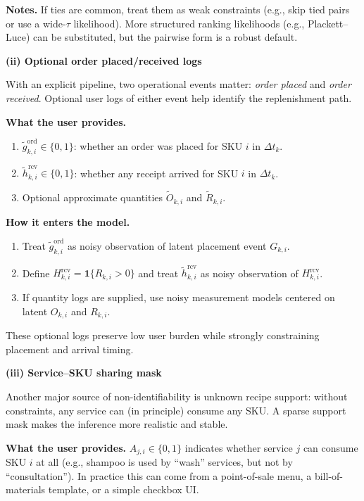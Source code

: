 \documentclass[11pt]{article}
\begin{document}
\textbf{Notes.} If ties are common, treat them as weak constraints (e.g., skip tied pairs or use a wide-$\tau$ likelihood).
More structured ranking likelihoods (e.g., Plackett--Luce) can be substituted, but the pairwise form is a robust default.

\textbf{(ii) Optional order placed/received logs}

With an explicit pipeline, two operational events matter: \emph{order placed} and \emph{order received}.
Optional user logs of either event help identify the replenishment path.

\textbf{What the user provides.}
\begin{enumerate}
  \item $\tilde g^{\mathrm{ord}}_{k,i}\in\{0,1\}$: whether an order was placed for SKU $i$ in $\Delta t_k$.
  \item $\tilde h^{\mathrm{rcv}}_{k,i}\in\{0,1\}$: whether any receipt arrived for SKU $i$ in $\Delta t_k$.
  \item Optional approximate quantities $\tilde O_{k,i}$ and $\tilde R_{k,i}$.
\end{enumerate}

\textbf{How it enters the model.}
\begin{enumerate}
  \item Treat $\tilde g^{\mathrm{ord}}_{k,i}$ as noisy observation of latent placement event $G_{k,i}$.
  \item Define $H^{\mathrm{rcv}}_{k,i}=\mathbf{1}\{R_{k,i}>0\}$ and treat $\tilde h^{\mathrm{rcv}}_{k,i}$ as noisy observation of $H^{\mathrm{rcv}}_{k,i}$.
  \item If quantity logs are supplied, use noisy measurement models centered on latent $O_{k,i}$ and $R_{k,i}$.
\end{enumerate}

These optional logs preserve low user burden while strongly constraining placement and arrival timing.

\textbf{(iii) Service--SKU sharing mask}

Another major source of non-identifiability is unknown recipe support: without constraints, any service can (in principle) consume any SKU.
A sparse support mask makes the inference more realistic and stable.

\textbf{What the user provides.} $A_{j,i}\in\{0,1\}$ indicates whether service $j$ can consume SKU $i$ at all (e.g., shampoo is used by ``wash'' services, but not by ``consultation'').
In practice this can come from a point-of-sale menu, a bill-of-materials template, or a simple checkbox UI.
\end{document}
